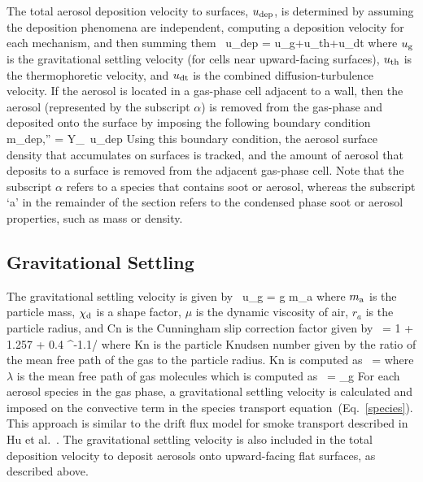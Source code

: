 The total aerosol deposition velocity to surfaces, $u_{\rm dep}$, is determined by assuming the deposition phenomena are independent, computing a deposition velocity for each mechanism, and then summing them~\cite{Bixler:1}
\be
u_{\rm dep} = u_{\rm g}+u_{\rm th}+u_{\rm dt}
\ee
where $u_{\rm g}$ is the gravitational settling velocity (for cells near upward-facing surfaces), $u_{\rm th}$ is the thermophoretic velocity, and $u_{\rm dt}$ is the combined diffusion-turbulence velocity. If the aerosol is located in a gas-phase cell adjacent to a wall, then the aerosol (represented by the subscript $\alpha$) is removed from the gas-phase and deposited onto the surface by imposing the following boundary condition
\be
\dot m_{\rm dep,\alpha}'' = \rho Y_\alpha \, u_{\rm dep}
\ee
Using this boundary condition, the aerosol surface density that accumulates on surfaces is tracked, and the amount
of aerosol that deposits to a surface is removed from the adjacent gas-phase cell.
Note that the subscript $\alpha$ refers to a species that contains soot or aerosol, whereas the subscript `a'
in the remainder of the section refers to the condensed phase soot or aerosol properties, such as mass or density.

\subsection{Gravitational Settling}

The gravitational settling velocity is given by~\cite{Davies_Charles}
\be
u_{\rm g} = g m_{\rm a} 
\ee
where $m_{\rm a}$ is the particle mass, $\chi_{\rm d}$ is a shape factor, $\mu$ is the dynamic viscosity of air,
$r_a$ is the particle radius, and Cn is the Cunningham slip correction factor given by~\cite{Davies_Charles}
\be
{} = 1 + 1.257 \;  + 0.4 \;  \; ^{-1.1/}
\ee
where Kn is the particle Knudsen number given by the ratio of the mean free path of the gas
to the particle radius. Kn is computed as~\cite{Sippola:1}
\be
{} = 
\ee
where $\lambda$ is the mean free path of gas molecules which is computed as~\cite{Jennings_S_G}
\be
\lambda = \mu_g \; 
\ee
For each aerosol species in the gas phase, a gravitational settling velocity is calculated
and imposed on the convective term in the species transport
equation~(Eq.~\ref{species}). This approach is similar to the drift flux model
for smoke transport described in Hu et al.~\cite{Hu:1}. The gravitational settling velocity
is also included in the total deposition velocity to deposit aerosols onto upward-facing flat surfaces,
as described above.


